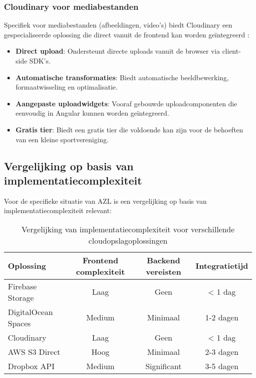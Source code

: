 \subsubsection{Cloudinary voor mediabestanden}
Specifiek voor mediabestanden (afbeeldingen, video's) biedt Cloudinary een gespecialiseerde oplossing die direct vanuit de frontend kan worden geïntegreerd \autocite{cloudinary_angular}:

\begin{itemize}
  \item \textbf{Direct upload}: Ondersteunt directe uploads vanuit de browser via client-side SDK's.
  \item \textbf{Automatische transformaties}: Biedt automatische beeldbewerking, formaatwisseling en optimalisatie.
  \item \textbf{Aangepaste uploadwidgets}: Vooraf gebouwde uploadcomponenten die eenvoudig in Angular kunnen worden geïntegreerd.
  \item \textbf{Gratis tier}: Biedt een gratis tier die voldoende kan zijn voor de behoeften van een kleine sportvereniging.
\end{itemize}

\subsection{Vergelijking op basis van implementatiecomplexiteit}
Voor de specifieke situatie van AZL is een vergelijking op basis van implementatiecomplexiteit relevant:

\begin{table}[h]
\centering
\begin{tabular}{|l|c|c|c|}
\hline
\textbf{Oplossing} & \textbf{Frontend complexiteit} & \textbf{Backend vereisten} & \textbf{Integratietijd} \\
\hline
Firebase Storage & Laag & Geen & < 1 dag \\
\hline
DigitalOcean Spaces & Medium & Minimaal & 1-2 dagen \\
\hline
Cloudinary & Laag & Geen & < 1 dag \\
\hline
AWS S3 Direct & Hoog & Minimaal & 2-3 dagen \\
\hline
Dropbox API & Medium & Significant & 3-5 dagen \\
\hline
\end{tabular}
\caption{Vergelijking van implementatiecomplexiteit voor verschillende cloudopslagoplossingen}
\label{table:implementation-complexity}
\end{table}

